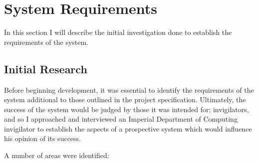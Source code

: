 \documentclass[a4paper, 12pt, notitlepage]{report}
\begin{document}
\section{System Requirements}

In this section I will describe the initial investigation done to establish the requirements of the system.

\subsection{Initial Research}

Before beginning development, it was essential to identify the requirements of the system additional to those outlined in the project specification.  Ultimately, the success of the system would be judged by those it was intended for; invigilators, and so I approached and interviewed an Imperial Department of Computing invigilator to establish the aspects of a prospective system which would influence his opinion of its success.

A number of areas were identified:
\end{document}
